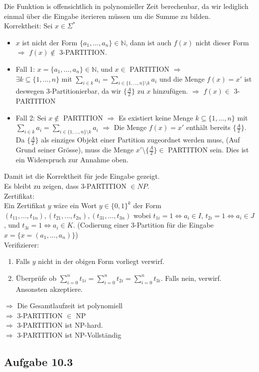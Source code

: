 Die Funktion is offensichtlich in polynomieller Zeit berechenbar, da wir lediglich einmal über die Eingabe iterieren müssen um 
die Summe zu bilden.\\

Korrektheit: Sei $x \in \Sigma^{*}$
\begin{itemize}
	\item $x$ ist nicht der Form $\{a_1,...,a_n\} \in \mathbb{N}$, dann ist auch $f(x)$ nicht dieser Form $\Rightarrow$ $f(x) \not\in $
		3-PARTITION.
	\item Fall 1: $x = \{a_1,...,a_n\} \in \mathbb{N}$, und $x \in $ PARTITION $\Rightarrow$\\
		 $\exists k \subseteq \{1,...,n\}$ mit $\sum_{i \in k} a_i = \sum_{i \in \{1,...,n\} \setminus k} a_i$ 
		 und die Menge $f(x) = x'$ ist deswegen 3-Partitionierbar, da wir
		$\{\frac{A}{2}\}$ zu $x$ hinzufügen. $\Rightarrow$ $f(x) \in$ 3-PARTITION
	\item Fall 2: Sei $x \not\in$ PARTITION $\Rightarrow$ Es existiert keine Menge $k \subseteq \{1,...,n\}$
		mit $\sum_{i \in k} a_i = \sum_{i \in \{1,...,n\} \setminus k} a_i$ $\Rightarrow$ Die Menge $f(x) = x'$ enthält bereits 
		$\{\frac{A}{2}\}$. Da $\{\frac{A}{2}\}$ als einziges Objekt einer Partition zugeordnet werden muss, (Auf Grund seiner Grösse),
		muss die Menge $x' \setminus \{\frac{A}{2}\} \in $ PARTITION sein. Dies ist ein Widerspruch zur Annahme oben.
\end{itemize}
Damit ist die Korrektheit für jede Eingabe gezeigt.\\
Es bleibt zu zeigen, dass 3-PARTITION $\in NP$.\\

Zertifikat:\\
Ein Zertifikat $y$ wäre ein Wort $y \in \{0, 1\}^k$ der Form $(t_{11},...,t_{1n}), (t_{21},...,t_{2n}), (t_{31},...,t_{3n})$ wobei
$t_{1i} = 1 \Leftrightarrow a_i \in I$, $t_{2i} = 1 \Leftrightarrow a_i \in J$, und $t_{3i} = 1 \Leftrightarrow a_i \in K$. (Codierung einer 3-Partition für die Eingabe $x = \{x = (a_1,...,a_n)\}$)\\

Verifizierer:
\begin{enumerate}
	\item Falls $y$ nicht in der obigen Form vorliegt verwirf.
	\item Überprüfe ob $\sum_{i = 0}^{n} t_{1i} = \sum_{i=0}^{n} t_{2i} = \sum_{i=0}^{n} t_{3i}$. Falls nein, verwirf. Ansonsten 
	akzeptiere.
\end{enumerate}

$\Rightarrow$ Die Gesamtlaufzeit ist polynomiell\\
$\Rightarrow$ 3-PARTITION $\in$ NP\\
$\Rightarrow$ 3-PARTITION ist NP-hard.\\

$\Rightarrow$ 3-PARTITION ist NP-Vollständig


\subsection*{Aufgabe 10.3}
